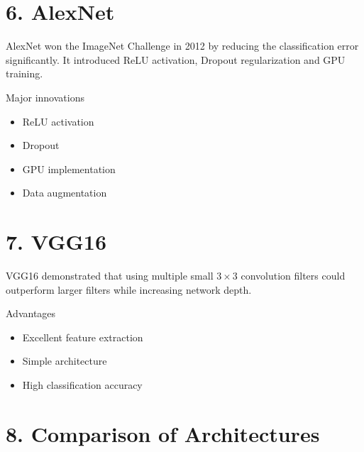 \documentclass[11pt]{article}
\begin{document}

\section*{6. AlexNet}

AlexNet won the ImageNet Challenge in 2012 by reducing the
classification error significantly. It introduced ReLU activation,
Dropout regularization and GPU training.


Major innovations

\begin{itemize}

\item ReLU activation

\item Dropout

\item GPU implementation

\item Data augmentation

\end{itemize}


\section*{7. VGG16}

VGG16 demonstrated that using multiple small $3\times3$ convolution
filters could outperform larger filters while increasing network depth.


Advantages

\begin{itemize}

\item Excellent feature extraction

\item Simple architecture

\item High classification accuracy

\end{itemize}


\section*{8. Comparison of Architectures}
\end{document}
